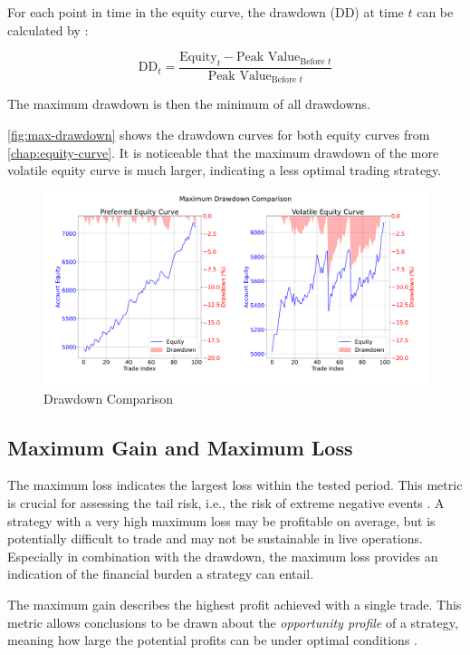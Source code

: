 For each point in time in the equity curve, the drawdown (DD) at time $t$ can be calculated by \cite{dd}:

\[
    \text{DD}_t = \frac{\text{Equity}_t - \text{Peak Value}_{\text{Before }t}}{\text{Peak Value}_{\text{Before }t}}

\]

\noindent
The maximum drawdown is then the minimum of all drawdowns.

\autoref{fig:max-drawdown} shows the drawdown curves for both equity curves from \autoref{chap:equity-curve}.
It is noticeable that the maximum drawdown of the more volatile equity curve is much larger, indicating a less optimal trading strategy.

\begin{figure}[H]
    \centering
    \includegraphics[width=\textwidth]{images/trading-strategies/max-drawdown}
    \caption{Drawdown Comparison}
    \label{fig:max-drawdown}
\end{figure}

\subsection{Maximum Gain and Maximum Loss}

The maximum loss indicates the largest loss within the tested period.
This metric is crucial for assessing the tail risk, i.e., the risk of extreme negative events \cite{max-loss}.
A strategy with a very high maximum loss may be profitable on average, but is potentially difficult to trade and may not be sustainable in live operations.
Especially in combination with the drawdown, the maximum loss provides an indication of the financial burden a strategy can entail.

The maximum gain describes the highest profit achieved with a single trade.
This metric allows conclusions to be drawn about the \textit{opportunity profile} of a strategy, meaning how large the potential profits can be under optimal conditions \cite{max-gain}.

